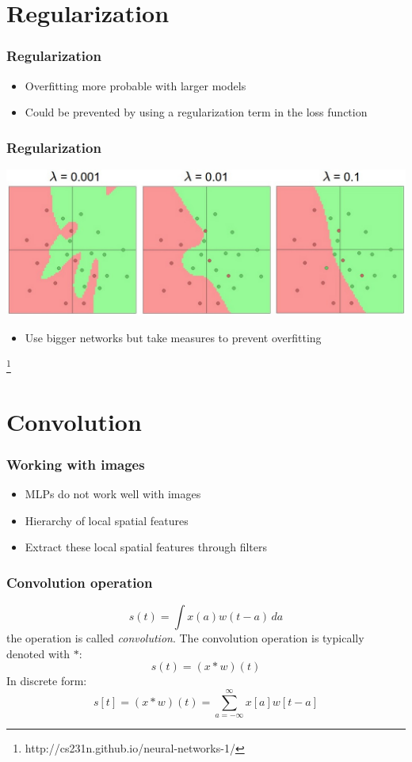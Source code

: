 \documentclass{beamer}
\newcommand\blfootnote[1]{%
  \begingroup
  \renewcommand\thefootnote{}\footnote{#1}%
  \addtocounter{footnote}{-1}%
  \endgroup
}
\begin{document}
\section{Regularization}

\begin{frame}
  \frametitle{Regularization}
  \begin{itemize}
  \item Overfitting more probable with larger models
  \item Could be prevented by using a regularization term in the loss function
  \end{itemize}
\end{frame}

\begin{frame}
  \frametitle{Regularization}
  \includegraphics[width=\textwidth]{reg_strengths.jpeg}
  \begin{itemize}
  \item Use bigger networks but take measures to prevent overfitting
  \end{itemize}
  \blfootnote{http://cs231n.github.io/neural-networks-1/}
\end{frame}

\section{Convolution}

\begin{frame}
  \frametitle{Working with images}
  \begin{itemize}
  \item MLPs do not work well with images
  \item Hierarchy of local spatial features
  \item Extract these local spatial features through filters
  \end{itemize}
\end{frame}

\begin{frame}
  \frametitle{Convolution operation}

  \begin{equation*}
    s(t)=\int x(a)w(t-a)\, da
  \end{equation*}
  the operation is called \emph{convolution}. The convolution operation is typically denoted with $*$:
  \begin{equation*}
    s(t)=(x*w)(t)
  \end{equation*}
  In discrete form:
  \begin{equation*}
    s[t]=(x*w)(t)=\sum_{a=-\infty}^{\infty}x[a]w[t-a]
  \end{equation*}
\end{frame}
\end{document}
